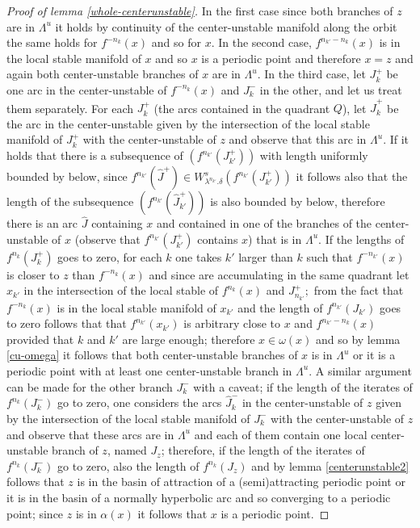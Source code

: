 \documentclass[a4paper,11pt]{article}
\theoremstyle{definition}
\def\La{\Lambda}
\def\la{\lambda}
\def\de{\delta}
\def\La{\Lambda}
\begin{document}
\begin{proof}[Proof of lemma \ref{whole-centerunstable}]
In the first case since both branches of $z$ are in $\La^u$ it holds by continuity of the center-unstable manifold along the orbit the same holds for $f^{-n_k}(x)$ and so for $x$. In the second case, $f^{n_{k'}-n_k}(x)$ is in the local stable manifold of $x$ and so $x$ is a periodic point and therefore $x=z$ and again both center-unstable  branches of $x$ are in $\La^u.$ In the third case, let  $J_k^{+}$ be one arc in the center-unstable of $f^{-n_k}(x)$ and $J_k^{-}$  in the other, and let us treat them separately. For each $J^+_k$ (the arcs contained in the quadrant $Q$), let $\hat J^+_k$ be the arc in the center-unstable given by the intersection of the local stable manifold of $J^+_k$ with the center-unstable of $z$ and observe that this arc in $\La^u$. If it holds that there is a subsequence of $(f^{n_{k'}}(J^+_{k'}))$ with length uniformly bounded by below, since $f^{n_{k'}}(\hat J^+)\in W^s_{\la^{n_{k'}}.\de}(f^{n_{k'}}(J_{k'}^+))$ it follows also that the length of the subsequence $(f^{n_{k'}}(\hat J^+_{k'}))$ is also bounded by below, therefore  there is an arc $\hat J$ containing $x$ and contained  in one of the branches of the center-unstable of $x$ (observe that $f^{n_{k'}}(J^+_{k'})$ contains $x$) that is in $\La^u.$ If the lengths of $f^{n_k}(J^+_k)$ goes to zero, for each $k$ one takes $k'$ larger than $k$ such that $f^{-n_{k'}}(x)$ is closer to $z$ than $f^{-n_k}(x)$ and since are accumulating in the same quadrant let $x_{k'}$ in the intersection of the local stable of $f^{n_k}(x)$ and $J^+_{n_{k'}};$ from the fact that $f^{-n_k}(x)$  is in the local stable manifold of $x_{k'}$ and the length of $f^{n_{k'}}(J_{k'})$ goes to zero follows that that $f^{n_{k'}}(x_{k'})$ is arbitrary close to $x$ and $f^{n_{k'}-n_k}(x)$ provided that $k$ and $k'$ are large enough; therefore $x\in \omega(x)$ and so by lemma \ref{cu-omega} it follows that both center-unstable branches of $x$ is in $\La^u$ or it is a periodic point with at least  one center-unstable branch in $\La^u$. A similar argument can be made for the other branch $J^-_k$ with a caveat; if the length of the iterates of $f^{n_k}(J^-_k)$ go to zero, one considers  the arcs  $\hat J^-_k$  in the center-unstable of $z$ given by the intersection of the local stable manifold of $J^-_k$ with the center-unstable of $z$ and observe that these arcs are in $\La^u$ and each of them contain one local center-unstable branch of $z$, named $J_z$; therefore, if the length of the iterates of $f^{n_k}(J^-_k)$ go to zero, also the length of $f^{n_k}(J_z)$ and by lemma \ref{centerunstable2} follows that $z$ is in the basin of attraction of a (semi)attracting periodic point or it is in the basin of a normally hyperbolic arc and so converging to a periodic point; since $z$ is  in $\alpha(x)$ it follows that $x$ is  a periodic point.






\end{proof}
\end{document}
